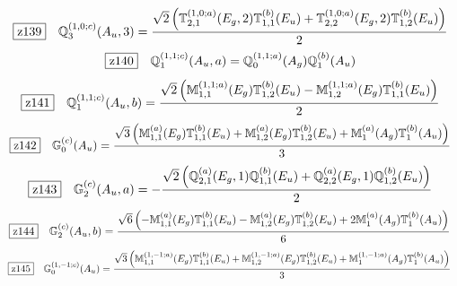 \documentclass[fleqn,10pt,landscape]{jsarticle}
\begin{document}
\begin{dmath*}
\hspace*{3mm}\fbox{z139}\quad \mathbb{Q}_{3}^{(1,0;c)}(A_{u},3)=\frac{\sqrt{2} \left(\mathbb{T}_{2,1}^{(1,0;a)}(E_{g},2) \mathbb{T}_{1,1}^{(b)}(E_{u}) + \mathbb{T}_{2,2}^{(1,0;a)}(E_{g},2) \mathbb{T}_{1,2}^{(b)}(E_{u})\right)}{2}
\end{dmath*}
\begin{dmath*}
\hspace*{3mm}\fbox{z140}\quad \mathbb{Q}_{1}^{(1,1;c)}(A_{u},a)=\mathbb{Q}_{0}^{(1,1;a)}(A_{g}) \mathbb{Q}_{1}^{(b)}(A_{u})
\end{dmath*}
\begin{dmath*}
\hspace*{3mm}\fbox{z141}\quad \mathbb{Q}_{1}^{(1,1;c)}(A_{u},b)=\frac{\sqrt{2} \left(\mathbb{M}_{1,1}^{(1,1;a)}(E_{g}) \mathbb{T}_{1,2}^{(b)}(E_{u}) - \mathbb{M}_{1,2}^{(1,1;a)}(E_{g}) \mathbb{T}_{1,1}^{(b)}(E_{u})\right)}{2}
\end{dmath*}
\begin{dmath*}
\hspace*{3mm}\fbox{z142}\quad \mathbb{G}_{0}^{(c)}(A_{u})=\frac{\sqrt{3} \left(\mathbb{M}_{1,1}^{(a)}(E_{g}) \mathbb{T}_{1,1}^{(b)}(E_{u}) + \mathbb{M}_{1,2}^{(a)}(E_{g}) \mathbb{T}_{1,2}^{(b)}(E_{u}) + \mathbb{M}_{1}^{(a)}(A_{g}) \mathbb{T}_{1}^{(b)}(A_{u})\right)}{3}
\end{dmath*}
\begin{dmath*}
\hspace*{3mm}\fbox{z143}\quad \mathbb{G}_{2}^{(c)}(A_{u},a)=- \frac{\sqrt{2} \left(\mathbb{Q}_{2,1}^{(a)}(E_{g},1) \mathbb{Q}_{1,1}^{(b)}(E_{u}) + \mathbb{Q}_{2,2}^{(a)}(E_{g},1) \mathbb{Q}_{1,2}^{(b)}(E_{u})\right)}{2}
\end{dmath*}
\begin{dmath*}
\hspace*{3mm}\fbox{z144}\quad \mathbb{G}_{2}^{(c)}(A_{u},b)=\frac{\sqrt{6} \left(- \mathbb{M}_{1,1}^{(a)}(E_{g}) \mathbb{T}_{1,1}^{(b)}(E_{u}) - \mathbb{M}_{1,2}^{(a)}(E_{g}) \mathbb{T}_{1,2}^{(b)}(E_{u}) + 2 \mathbb{M}_{1}^{(a)}(A_{g}) \mathbb{T}_{1}^{(b)}(A_{u})\right)}{6}
\end{dmath*}
\begin{dmath*}
\hspace*{3mm}\fbox{z145}\quad \mathbb{G}_{0}^{(1,-1;c)}(A_{u})=\frac{\sqrt{3} \left(\mathbb{M}_{1,1}^{(1,-1;a)}(E_{g}) \mathbb{T}_{1,1}^{(b)}(E_{u}) + \mathbb{M}_{1,2}^{(1,-1;a)}(E_{g}) \mathbb{T}_{1,2}^{(b)}(E_{u}) + \mathbb{M}_{1}^{(1,-1;a)}(A_{g}) \mathbb{T}_{1}^{(b)}(A_{u})\right)}{3}
\end{dmath*}
\end{document}
